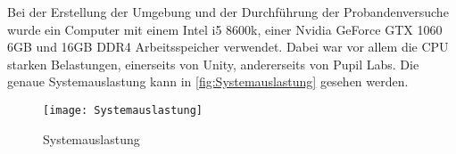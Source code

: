 Bei der Erstellung der Umgebung und der Durchführung der Probandenversuche wurde ein Computer mit einem Intel i5 8600k, einer Nvidia GeForce GTX 1060 6GB und 16GB DDR4 Arbeitsspeicher verwendet. Dabei war vor allem die CPU starken Belastungen, einerseits von Unity, andererseits von Pupil Labs. Die genaue Systemauslastung kann in \autoref{fig:Systemauslastung} gesehen werden.

\begin{figure}[!htbp]
	\centering
	\texttt{[image: Systemauslastung]}
	\caption[Systemauslastung]{Systemauslastung}
	\label{fig:Systemauslastung}
\end{figure}